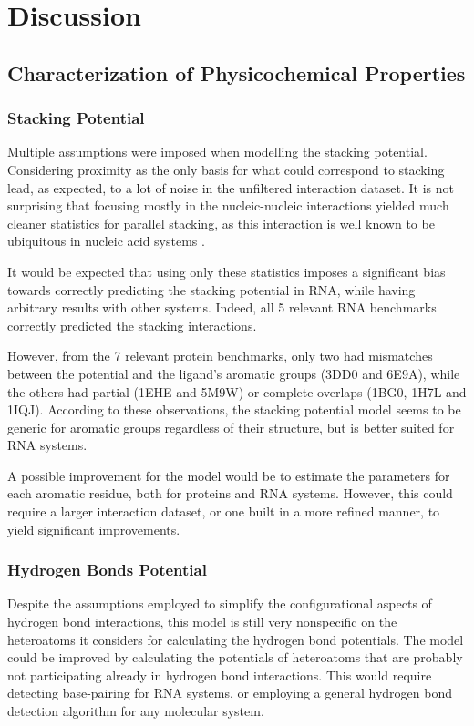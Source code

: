 \chapter{Discussion} %

\section{Characterization of Physicochemical Properties}
  \subsection{Stacking Potential}
    Multiple assumptions were imposed when modelling the stacking potential. Considering proximity as the only basis for what could correspond to stacking lead, as expected, to a lot of noise in the unfiltered interaction dataset. It is not surprising that focusing mostly in the nucleic-nucleic interactions yielded much cleaner statistics for parallel stacking, as this interaction is well known to be ubiquitous in nucleic acid systems \cite{rna_2015}.

    It would be expected that using only these statistics imposes a significant bias towards correctly predicting the stacking potential in RNA, while having arbitrary results with other systems. Indeed, all 5 relevant RNA benchmarks correctly predicted the stacking interactions.

    However, from the 7 relevant protein benchmarks, only two had mismatches between the potential and the ligand's aromatic groups (3DD0 and 6E9A), while the others had partial (1EHE and 5M9W) or complete overlaps (1BG0, 1H7L and 1IQJ). According to these observations, the stacking potential model seems to be generic for aromatic groups regardless of their structure, but is better suited for RNA systems.

    A possible improvement for the model would be to estimate the parameters for each aromatic residue, both for proteins and RNA systems. However, this could require a larger interaction dataset, or one built in a more refined manner, to yield significant improvements.

  \subsection{Hydrogen Bonds Potential}
    Despite the assumptions employed to simplify the configurational aspects of hydrogen bond interactions, this model is still very nonspecific on the heteroatoms it considers for calculating the hydrogen bond potentials. The model could be improved by calculating the potentials of heteroatoms that are probably not participating already in hydrogen bond interactions. This would require detecting base-pairing for RNA systems, or employing a general hydrogen bond detection algorithm for any molecular system.

